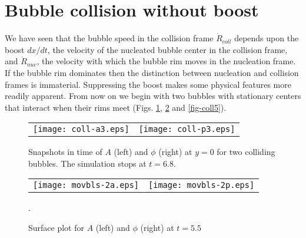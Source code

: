 \documentclass[preprintnumbers,eqsecnum,aps,prd,epsf,showpacs,nofootinbib
]{revtex4}
\begin{document}
\section{Bubble collision without boost}
We have seen that the bubble speed in the collision frame ${\dot
  R}_{coll}$ depends upon the boost $dx/dt$, the velocity of the
nucleated bubble center in the collision frame, and ${\dot R}_{nuc}$,
the velocity with which the bubble rim moves in the nucleation frame.
If the bubble rim dominates then the distinction between nucleation
and collision frames is immaterial. Suppressing the boost makes some
physical features more readily apparent. From now on we begin with two
bubbles with stationary centers that interact when their rims meet
(Figs. \ref{fig-coll3}, \ref{fig-coll4} and \ref{fig-coll5}).
\begin{figure}[htbp]
\begin{center}
\begin{tabular}{ll}
\texttt{[image: coll-a3.eps]} &
\hspace{0.5cm}
\texttt{[image: coll-p3.eps]}
\end{tabular}
\end{center}
\caption{Snapshots in time of $A$ (left) and $\phi$ (right) at $y=0$
for two colliding bubbles. The simulation stops at $t=6.8$.}
\label{fig-coll3}
\end{figure}
\begin{figure}[htbp]
\begin{center}
\begin{tabular}{ll}
\texttt{[image: movbls-2a.eps]} &
\hspace{0cm}
\texttt{[image: movbls-2p.eps]}
\end{tabular}
\end{center}
\caption{Surface plot for 
$A$ (left) and $\phi$ (right) at $t=5.5$}.
\label{fig-coll4}
\end{figure}
\end{document}
